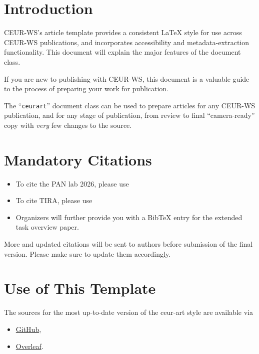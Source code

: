 \documentclass[]{ceurart}
\begin{document}
\maketitle

\section{Introduction}

CEUR-WS's article template provides a consistent \LaTeX{} style for
use across CEUR-WS publications, and incorporates accessibility and
metadata-extraction functionality. This document will explain the
major features of the document class.

If you are new to publishing with CEUR-WS, this document is a valuable
guide to the process of preparing your work for publication.

The ``\verb|ceurart|'' document class can be used to prepare articles
for any CEUR-WS publication, and for any stage of publication, from
review to final ``camera-ready'' copy with {\itshape very} few changes
to the source.

\section{Mandatory Citations}

\begin{itemize}
\item To cite the PAN lab 2026, please use \cite{bevendorff:2026b}
\item To cite TIRA, please use \cite{froebe:2023b}
\item Organizers will further provide you with a BibTeX entry for the extended task overview paper.
\end{itemize}

\noindent More and updated citations will be sent to authors before submission of the final version. Please make sure to update them accordingly.

\section{Use of This Template}

The sources for the most up-to-date version of the ceur-art style are available via
\begin{itemize}
\item \href{https://github.com/yamadharma/ceurart}{GitHub},
\item \href{https://www.overleaf.com/latex/templates/template-for-submissions-to-ceur-workshop-proceedings-ceur-ws-dot-org/pkfscdkgkhcq}{Overleaf}.
\end{itemize}
\end{document}
